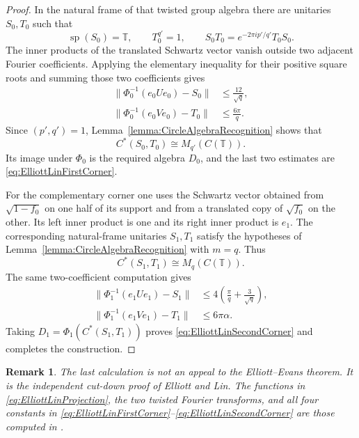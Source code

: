 \documentclass{book}
\newtheorem{remark}[definition]{Remark}
\begin{document}
\begin{proof}
  In the natural frame of that twisted group algebra there are unitaries
  \(S_0,T_0\) such that
  \[
    \operatorname{sp}(S_0)=\mathbb T,
    \qquad T_0^{q'}=1,
    \qquad
    S_0T_0=e^{-2\pi ip'/q'}T_0S_0.
  \]
  The inner products of the translated Schwartz vector vanish outside two
  adjacent Fourier coefficients. Applying the elementary inequality for
  their positive square roots and summing those two coefficients gives
  \begin{align*}
    \bigl\lVert\Phi_0^{-1}(e_0Ue_0)-S_0\bigr\rVert
      &\leq\frac{12}{\sqrt q},\\
    \bigl\lVert\Phi_0^{-1}(e_0Ve_0)-T_0\bigr\rVert
      &\leq\frac{6\pi}{q}.
  \end{align*}
  Since \((p',q')=1\), Lemma~\ref{lemma:CircleAlgebraRecognition} shows that
  \[
    C^*(S_0,T_0)\cong M_{q'}(C(\mathbb T)).
  \]
  Its image under \(\Phi_0\) is the required algebra \(D_0\), and the last
  two estimates are \eqref{eq:ElliottLinFirstCorner}.

  For the complementary corner one uses the Schwartz vector obtained from
  \(\sqrt{1-f_0}\) on one half of its support and from a translated copy of
  \(\sqrt{f_0}\) on the other. Its left inner product is one and its right
  inner product is \(e_1\). The corresponding natural-frame unitaries
  \(S_1,T_1\) satisfy the hypotheses of
  Lemma~\ref{lemma:CircleAlgebraRecognition} with \(m=q\). Thus
  \[
    C^*(S_1,T_1)\cong M_q(C(\mathbb T)).
  \]
  The same two-coefficient computation gives
  \begin{align*}
    \bigl\lVert\Phi_1^{-1}(e_1Ue_1)-S_1\bigr\rVert
      &\leq4\left(\frac\pi q+\frac3{\sqrt q}\right),\\
    \bigl\lVert\Phi_1^{-1}(e_1Ve_1)-T_1\bigr\rVert
      &\leq6\pi\alpha.
  \end{align*}
  Taking \(D_1=\Phi_1(C^*(S_1,T_1))\) proves
  \eqref{eq:ElliottLinSecondCorner} and completes the construction.
\end{proof}

\begin{remark}
  The last calculation is not an appeal to the Elliott--Evans theorem. It
  is the independent cut-down proof of Elliott and Lin. The functions in
  \eqref{eq:ElliottLinProjection}, the two twisted Fourier transforms, and
  all four constants in
  \eqref{eq:ElliottLinFirstCorner}--\eqref{eq:ElliottLinSecondCorner} are
  those computed in \cite[pp.~124--130]{ElliottLin1996}.
\end{remark}
\end{document}
